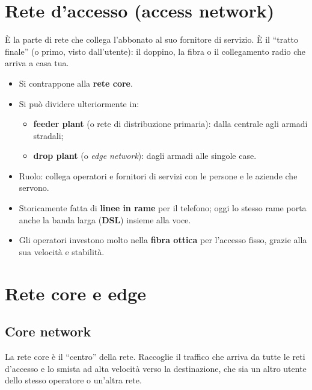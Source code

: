 \section{Rete d'accesso (access network)}

\begin{inbreve}

È la parte di rete che collega l'abbonato al suo fornitore di servizio. È il ``tratto finale'' (o primo, visto dall'utente): il doppino, la fibra o il collegamento radio che arriva a casa tua.

\end{inbreve}

\begin{itemize}
\tightlist
\item
  Si contrappone alla \textbf{rete core}.
\item
  Si può dividere ulteriormente in:

  \begin{itemize}
  \tightlist
  \item
    \textbf{feeder plant} (o rete di distribuzione primaria): dalla centrale agli armadi stradali;
  \item
    \textbf{drop plant} (o \emph{edge network}): dagli armadi alle singole case.
  \end{itemize}
\item
  Ruolo: collega operatori e fornitori di servizi con le persone e le aziende che servono.
\item
  Storicamente fatta di \textbf{linee in rame} per il telefono; oggi lo stesso rame porta anche la banda larga (\textbf{DSL}) insieme alla voce.
\item
  Gli operatori investono molto nella \textbf{fibra ottica} per l'accesso fisso, grazie alla sua velocità e stabilità.
\end{itemize}

\section{Rete core e edge}

\subsection{Core network}

\begin{inbreve}

La rete core è il ``centro'' della rete. Raccoglie il traffico che arriva da tutte le reti d'accesso e lo smista ad alta velocità verso la destinazione, che sia un altro utente dello stesso operatore o un'altra rete.

\end{inbreve}

